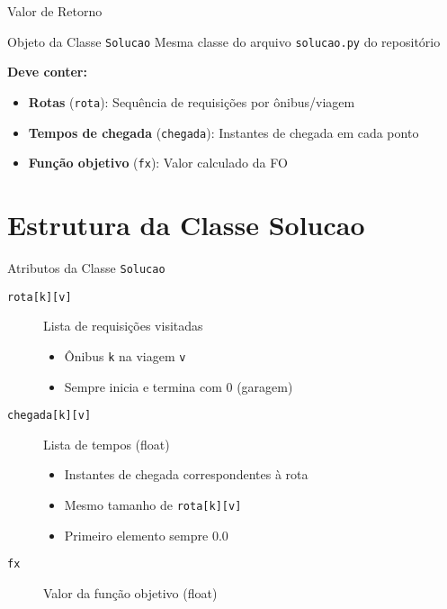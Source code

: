 \documentclass[10pt]{beamer}
\begin{document}
\begin{frame}{Valor de Retorno}
    \begin{block}{Objeto da Classe \texttt{Solucao}}
        Mesma classe do arquivo \texttt{solucao.py} do repositório
    \end{block}
    
    \vspace{0.5cm}
    
    \textbf{Deve conter:}
    \begin{itemize}
        \item \textbf{Rotas} (\texttt{rota}): Sequência de requisições por ônibus/viagem
        \item \textbf{Tempos de chegada} (\texttt{chegada}): Instantes de chegada em cada ponto
        \item \textbf{Função objetivo} (\texttt{fx}): Valor calculado da FO
    \end{itemize}
\end{frame}

\section{Estrutura da Classe Solucao}

\begin{frame}{Atributos da Classe \texttt{Solucao}}
    \begin{description}
        \item[\texttt{rota[k][v]}] Lista de requisições visitadas
        \begin{itemize}
            \item Ônibus \texttt{k} na viagem \texttt{v}
            \item Sempre inicia e termina com 0 (garagem)
        \end{itemize}
        
        \vspace{0.3cm}
        
        \item[\texttt{chegada[k][v]}] Lista de tempos (float)
        \begin{itemize}
            \item Instantes de chegada correspondentes à rota
            \item Mesmo tamanho de \texttt{rota[k][v]}
            \item Primeiro elemento sempre 0.0
        \end{itemize}
        
        \vspace{0.3cm}
        
        \item[\texttt{fx}] Valor da função objetivo (float)
    \end{description}
\end{frame}
\end{document}
